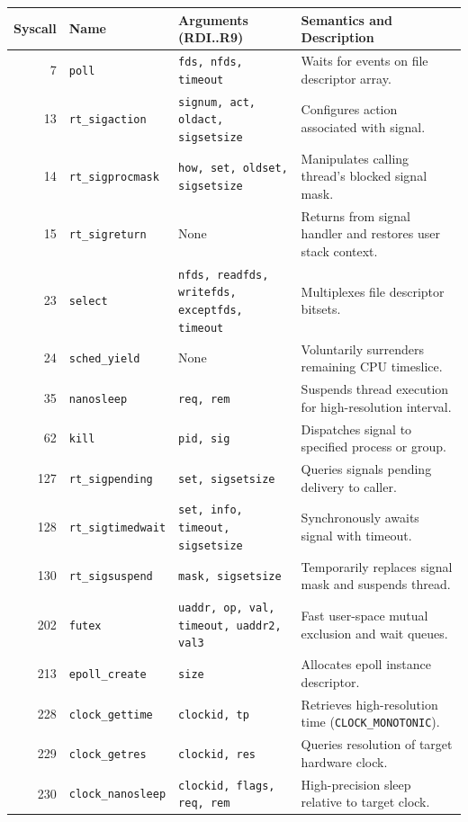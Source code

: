 \begin{table}[htbp]
\centering
\small
\begin{tabularx}{\textwidth}{rllX}
\toprule
\textbf{Syscall} & \textbf{Name} & \textbf{Arguments (RDI..R9)} & \textbf{Semantics and Description} \\
\midrule
7 & \texttt{poll} & \texttt{fds, nfds, timeout} & Waits for events on file descriptor array. \\
13 & \texttt{rt\_sigaction} & \texttt{signum, act, oldact, sigsetsize} & Configures action associated with signal. \\
14 & \texttt{rt\_sigprocmask} & \texttt{how, set, oldset, sigsetsize} & Manipulates calling thread's blocked signal mask. \\
15 & \texttt{rt\_sigreturn} & None & Returns from signal handler and restores user stack context. \\
23 & \texttt{select} & \texttt{nfds, readfds, writefds, exceptfds, timeout} & Multiplexes file descriptor bitsets. \\
24 & \texttt{sched\_yield} & None & Voluntarily surrenders remaining CPU timeslice. \\
35 & \texttt{nanosleep} & \texttt{req, rem} & Suspends thread execution for high-resolution interval. \\
62 & \texttt{kill} & \texttt{pid, sig} & Dispatches signal to specified process or group. \\
127 & \texttt{rt\_sigpending} & \texttt{set, sigsetsize} & Queries signals pending delivery to caller. \\
128 & \texttt{rt\_sigtimedwait} & \texttt{set, info, timeout, sigsetsize} & Synchronously awaits signal with timeout. \\
130 & \texttt{rt\_sigsuspend} & \texttt{mask, sigsetsize} & Temporarily replaces signal mask and suspends thread. \\
202 & \texttt{futex} & \texttt{uaddr, op, val, timeout, uaddr2, val3} & Fast user-space mutual exclusion and wait queues. \\
213 & \texttt{epoll\_create} & \texttt{size} & Allocates epoll instance descriptor. \\
228 & \texttt{clock\_gettime} & \texttt{clockid, tp} & Retrieves high-resolution time (\texttt{CLOCK\_MONOTONIC}). \\
229 & \texttt{clock\_getres} & \texttt{clockid, res} & Queries resolution of target hardware clock. \\
230 & \texttt{clock\_nanosleep} & \texttt{clockid, flags, req, rem} & High-precision sleep relative to target clock. \\

\end{tabularx}
\end{table}
